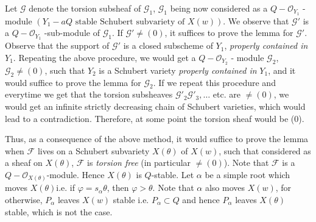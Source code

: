 \begin{Proof}
Let $\mathscr{G}$ denote the torsion subsheaf of $\mathscr{G}_1$, $\mathscr{G}_1$ being now considered as a $Q-\mathscr{O}_{Y_1}$ -module $(Y_1-a Q \text{ stable Schubert subvariety of } X(w))$. We observe that $\mathscr{G}'$ is a $Q-\mathscr{O}_{Y_1}$ -sub-module of $\mathscr{G}_1$. If $\mathscr{G}'\neq (0)$, it suffices to prove the lemma for $\mathscr{G}'$. Observe that the support of $\mathscr{G}'$ is a closed subscheme of $Y_1$, \textit{properly contained in} $Y_1$. Repeating the above procedure, we would get a $Q-\mathscr{O}_{Y_2}$ - module $\mathscr{G}_2$, $\mathscr{G}_2\neq (0)$, such that $Y_2$ is a Schubert variety \textit{properly contained in} $Y_1$, and it would suffice to prove the lemma for $\mathscr{G}_2$. If we repeat this procedure and everytime we get that the torsion subsheaves $\mathscr{G}'_2\mathscr{G}'_3,\ldots$ etc. are $\neq(0)$, we would get an infinite strictly decreasing chain of Schubert varieties, which would lead to a contradiction. Therefore, at some point the torsion sheaf would be (0). 

Thus, as a consequence of the above method, it would suffice to prove the lemma when $\mathscr{F}$ lives on a Schubert subvariety $X(\theta)$ of $X(w)$, such that considered as a sheaf on $X(\theta)$, $\mathscr{F}$ is \textit{torsion free} (in particular $\neq (0)$). Note that $\mathscr{F}$ is a $Q-\mathscr{O}_{X(\theta)}$-module. Hence $X(\theta)$ is $Q$-stable. Let $\alpha$ be a simple root which moves $X(\theta)$\pageoriginale i.e. if $\varphi=s_{\alpha}\theta$, then $\varphi>\theta$. Note that $\alpha$ also moves $X(w)$, for otherwise, $P_{\alpha}$ leaves $X(w)$ stable i.e. $P_{\alpha}\subset Q$ and hence $P_{\alpha}$ leaves $X(\theta)$ stable, which is not the case. 


\end{Proof}
